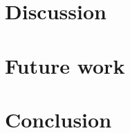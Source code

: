 \documentclass[11pt]{article}
\begin{document}
\section{Discussion}


\section{Future work}


\section{Conclusion}




\onecolumn
\begin{appendices}


\label{appendix:data}
\clearpage

\end{appendices}
\end{document}
